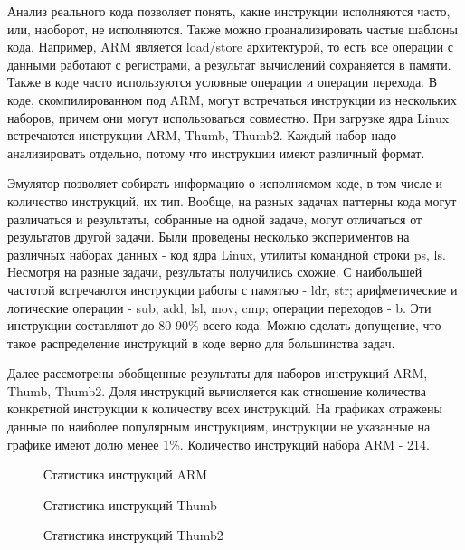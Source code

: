 Анализ реального кода позволяет понять, какие инструкции исполняются часто, или, наоборот, не исполняются. Также можно проанализировать частые шаблоны кода. Например, ARM является load/store архитектурой, то есть все операции с данными работают с регистрами, а результат вычислений сохраняется в памяти. Также в коде часто используются условные операции и операции перехода. В коде, скомпилированном под ARM, могут встречаться инструкции из нескольких наборов, причем они могут использоваться совместно. При загрузке ядра Linux встречаются инструкции  ARM, Thumb, Thumb2. Каждый набор надо анализировать отдельно, потому что инструкции имеют различный формат.

Эмулятор позволяет собирать информацию о исполняемом коде, в том числе и количество инструкций, их тип. Вообще, на разных задачах паттерны кода могут различаться и результаты, собранные на одной задаче, могут отличаться от результатов другой задачи. Были проведены несколько экспериментов на различных наборах данных - код ядра Linux, утилиты командной строки ps, ls. Несмотря на разные задачи, результаты получились схожие. С наибольшей частотой встречаются инструкции работы с памятью - ldr, str; арифметические и логические операции - sub, add, lsl, mov, cmp; операции переходов - b. Эти инструкции составляют до 80-90\% всего кода. Можно сделать допущение, что такое распределение инструкций в коде верно для большинства задач.

Далее рассмотрены обобщенные результаты для наборов инструкций ARM, Thumb, Thumb2. Доля инструкций вычисляется как отношение количества конкретной инструкции к количеству всех инструкций. На графиках отражены данные по наиболее популярным инструкциям, инструкции не указанные на графике имеют долю менее 1\%. Количество инструкций набора ARM - 214.

\begin{figure}[h!]
    \caption{Статистика инструкций ARM }
    \label{img:stat_arm_percent}
\end{figure}

\begin{figure}[h!]
    \caption{Статистика инструкций Thumb}
    \label{img:stat_thumb_num}
\end{figure}

\begin{figure}[h!]
    \caption{Статистика инструкций Thumb2}
    \label{img:stat_thumb2_num}
\end{figure}


